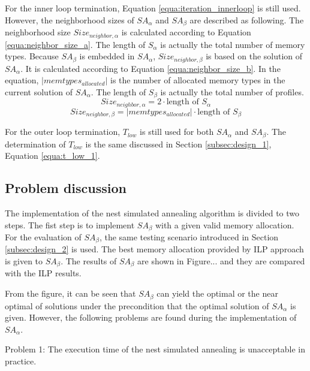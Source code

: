 		For the inner loop termination, Equation \ref{equa:iteration_innerloop} is still used.
		However, the neighborhood sizes of $SA_{\alpha}$ and $SA_{\beta}$
		are described as following.
		The neighborhood size $Size_{neighbor,\alpha}$ is calculated according to Equation \ref{equa:neighbor_size_a}.
		The length of $S_{\alpha}$ is actually the total number of memory types.
		Because $SA_{\beta}$ is embedded in $SA_{\alpha}$, $Size_{neighbor,\beta}$ is
		based on the solution of $SA_{\alpha}$.
		It is calculated according to Equation \ref{equa:neighbor_size_b}.
		In the equation, $\lvert memtypes_{allocated} \rvert$ is the number of
		allocated memory types in the current solution of $SA_{\alpha}$.
		The length of $S_{\beta}$ is actually the total number of profiles.
		\begin{equation}
		\label{equa:neighbor_size_a}
			Size_{neighbor,\alpha}=2 \cdot \text{length of } S_{\alpha} 
		\end{equation}
		\begin{equation}
		\label{equa:neighbor_size_b}
			Size_{neighbor,\beta}=\lvert memtypes_{allocated} \rvert \cdot \text{length of } S_{\beta} 
		\end{equation}
		
		For the outer loop termination, $T_{low}$ is still used for both
		$SA_{\alpha}$ and $SA_{\beta}$.
		The determination of $T_{low}$ is the same discussed in Section
		\ref{subsec:design_1}, Equation \ref{equa:t_low_1}.
	
		\subsection{Problem discussion}
		\label{subsec:problem_2}
		The implementation of the nest simulated annealing algorithm is divided to two steps.
		The fist step is to implement $SA_{\beta}$ with a given valid memory allocation.
		For the evaluation of $SA_{\beta}$, the same testing scenario introduced in
		Section \ref{subsec:design_2} is used. The best memory allocation provided by ILP
		approach is given to $SA_{\beta}$. The results of $SA_{\beta}$ are shown in
		Figure... and they are compared with the ILP results.
		
		From the figure, it can be seen that $SA_{\beta}$ can yield the optimal or the
		near optimal of solutions under the precondition that the optimal solution of
		$SA_{\alpha}$ is given.
		However, the following problems are found during the implementation of $SA_{\alpha}$.
		
		Problem 1: The execution time of the nest simulated annealing is unacceptable in
		practice.
		
